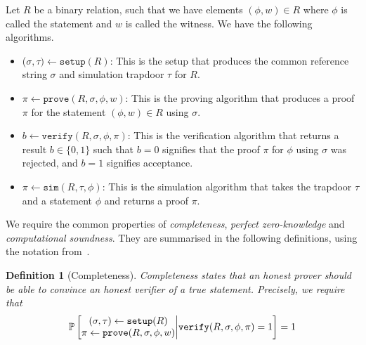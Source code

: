 \documentclass{article}
\newtheorem{definition}{Definition}
\theoremstyle{remark}
\renewcommand{\P}{\mathbb{P}}
\begin{document}
Let $R$ be a binary relation, such that we have elements $(\phi, w) \in R$
where $\phi$ is called the statement and $w$ is called the witness. We have the
following algorithms.

\begin{itemize}
	\item ($\sigma, \tau) \leftarrow \texttt{setup}(R)$: This is the setup that
		produces the common reference string $\sigma$ and simulation trapdoor
		$\tau$ for $R$.

	\item $\pi \leftarrow \texttt{prove}(R, \sigma, \phi, w)$: This is the
		proving algorithm that produces a proof $\pi$ for the statement $(\phi,
		w) \in R$ using $\sigma$.

	\item $b \leftarrow \texttt{verify}(R, \sigma, \phi, \pi)$: This is the
		verification algorithm that returns a result $b \in \{0, 1\}$ such that
		$b = 0$ signifies that the proof $\pi$ for $\phi$ using $\sigma$ was
		rejected, and $b = 1$ signifies acceptance.

	\item $\pi \leftarrow \texttt{sim}(R, \tau, \phi)$: This is the simulation
		algorithm that takes the trapdoor $\tau$ and a statement $\phi$ and
		returns a proof $\pi$.
\end{itemize}

We require the common properties of \textit{completeness}, \textit{perfect
zero-knowledge} and \textit{computational soundness}. They are summarised in
the following definitions, using the notation from~\cite{g16}.

\begin{definition}[Completeness]
	Completeness states that an honest prover should be able to convince an
	honest verifier of a true statement. Precisely, we require that
	\begin{align*}
		\P\left[
			\begin{matrix}
				(\sigma, \tau) \leftarrow \textup{\texttt{setup}}(R) \\
				\pi \leftarrow \textup{\texttt{prove}}(R, \sigma, \phi, w)
			\end{matrix}
			\middle|
			\textup{\texttt{verify}}(R, \sigma, \phi, \pi) = 1
		\right]
		=
		1
	\end{align*}
\end{definition}
\end{document}
